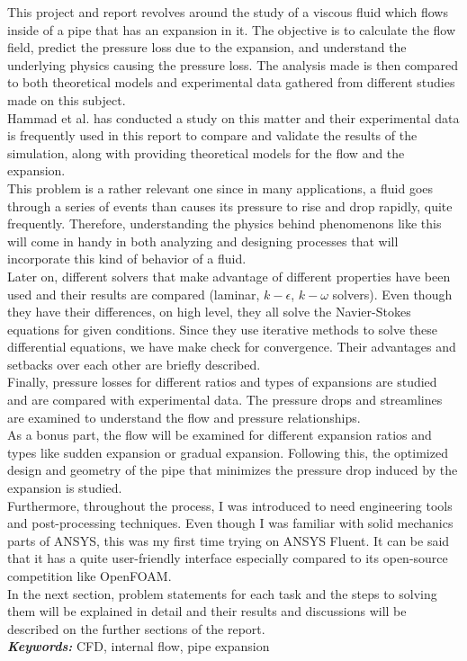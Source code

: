 This project and report revolves around the study of a viscous fluid which flows inside of a pipe that has an expansion in it. The objective is to calculate the flow field, predict the pressure loss
due to the expansion, and understand the underlying physics causing the pressure loss. The analysis made is then compared to both theoretical models and experimental data gathered from different studies made on this subject.\\

\noindent Hammad et al. \cite{hammad_ötügen_arik_1999} has conducted a study on this matter and their experimental data is frequently used in this report to compare and validate the results of the simulation, along with providing theoretical models for the flow and the expansion.\\ 


\noindent This problem is a rather relevant one since in many applications, a fluid goes through a series of events than causes its pressure to rise and drop rapidly, quite frequently. Therefore, understanding the physics behind phenomenons like this will come in handy in both analyzing and designing processes that will incorporate this kind of behavior of a fluid.\\


\noindent Later on, different solvers that make advantage of different properties have been used and their results are compared (laminar, $k -\epsilon$, $k - \omega$ solvers). Even though they have their differences, on high level, they all solve the Navier-Stokes equations for given conditions. Since they use iterative methods to solve these differential equations, we have make check for convergence. Their advantages and setbacks over each other are briefly described.\\


\noindent Finally, pressure losses for different ratios and types of expansions are studied and are compared with experimental data. The pressure drops and streamlines are examined to understand the flow and pressure relationships.\\


\noindent As a bonus part, the flow will be examined for different expansion ratios and types like sudden expansion or gradual expansion. Following this, the optimized design and geometry of the pipe that minimizes the pressure drop induced by the expansion is studied.\\



\noindent Furthermore, throughout the process, I was introduced to need engineering tools and post-processing techniques. Even though I was familiar with solid mechanics parts of ANSYS, this was my first time trying on ANSYS Fluent. It can be said that it has a quite user-friendly interface especially compared to its open-source competition like OpenFOAM. \\



\noindent In the next section, problem statements for each task and the steps to solving them will be explained in detail and their results and discussions will be described on the further sections of the report. \\



\textbf{\textit{Keywords:}} CFD, internal flow, pipe expansion